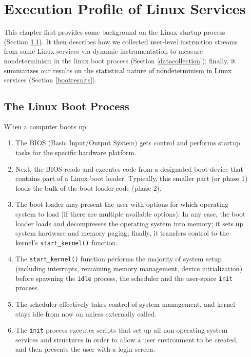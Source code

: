 \chapter{Execution Profile of Linux Services}
This chapter first provides some background on the
Linux startup process (Section \ref{linuxboot}).  
It then describes how we collected user-level instruction
streams from some Linux services via dynamic instrumentation to 
measure nondeterminism in the linux boot process (Section \ref{datacollection});
finally, it summarizes our results on the statistical nature
of nondeterminism in Linux services (Section \ref{bootresults}).

\section{The Linux Boot Process}\label{linuxboot}
When a computer boots up:
\begin{enumerate}
\item The BIOS (Basic Input/Output System) 
gets control and performs startup tasks for the specific hardware platform.
\item Next, the BIOS reads and executes code from a designated boot device 
that contains part of a Linux boot loader. Typically,
this smaller part (or phase 1) 
loads the bulk of the boot loader code (phase 2).
\item The boot loader may present the user with options for 
which operating system to load (if there are multiple available options).
In any case, the boot loader loads and decompresses the operating system
into memory; it sets up system hardware and
memory paging; finally, it transfers control to the kernel's
\texttt{start\_kernel()} function.
\item The \texttt{start\_kernel()} function performs the 
majority of system setup (including interrupts, remaining memory
 management, device initialization)
before spawning the \texttt{idle} process, the scheduler
and the user-space \texttt{init} process.
\item The scheduler effectively takes control of system management,
and kernel stays idle from now on unless externally called.
\item The \texttt{init} process executes scripts that set up all
non-operating system services and structures in order to allow 
a user environment to be created, and then presents the user with a login screen.
\end{enumerate}

